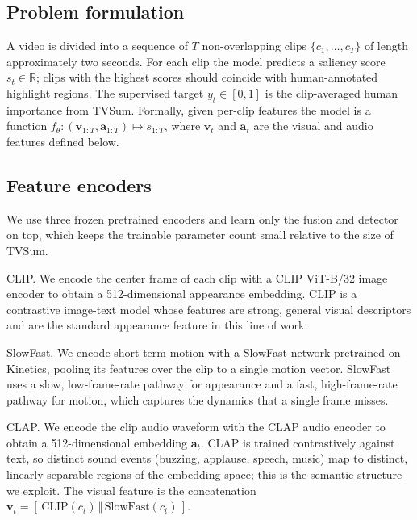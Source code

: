 \documentclass[10pt,twocolumn,letterpaper]{article}
\begin{document}
\subsection{Problem formulation}
A video is divided into a sequence of $T$ non-overlapping clips $\{c_1,\dots,c_T\}$ of length approximately two seconds. For each clip the model predicts a saliency score $s_t \in \mathbb{R}$; clips with the highest scores should coincide with human-annotated highlight regions. The supervised target $y_t \in [0,1]$ is the clip-averaged human importance from TVSum. Formally, given per-clip features the model is a function $f_\theta : (\mathbf{v}_{1:T}, \mathbf{a}_{1:T}) \mapsto s_{1:T}$, where $\mathbf{v}_t$ and $\mathbf{a}_t$ are the visual and audio features defined below.

\subsection{Feature encoders}
We use three frozen pretrained encoders and learn only the fusion and detector on top, which keeps the trainable parameter count small relative to the size of TVSum.

CLIP. We encode the center frame of each clip with a CLIP ViT-B/32 image encoder \cite{clip} to obtain a 512-dimensional appearance embedding. CLIP is a contrastive image-text model whose features are strong, general visual descriptors and are the standard appearance feature in this line of work.

SlowFast. We encode short-term motion with a SlowFast network \cite{slowfast} pretrained on Kinetics, pooling its features over the clip to a single motion vector. SlowFast uses a slow, low-frame-rate pathway for appearance and a fast, high-frame-rate pathway for motion, which captures the dynamics that a single frame misses.

CLAP. We encode the clip audio waveform with the CLAP audio encoder \cite{clap,laionclap} to obtain a 512-dimensional embedding $\mathbf{a}_t$. CLAP is trained contrastively against text, so distinct sound events (buzzing, applause, speech, music) map to distinct, linearly separable regions of the embedding space; this is the semantic structure we exploit. The visual feature is the concatenation $\mathbf{v}_t = [\,\mathrm{CLIP}(c_t)\,\Vert\,\mathrm{SlowFast}(c_t)\,]$.
\end{document}
